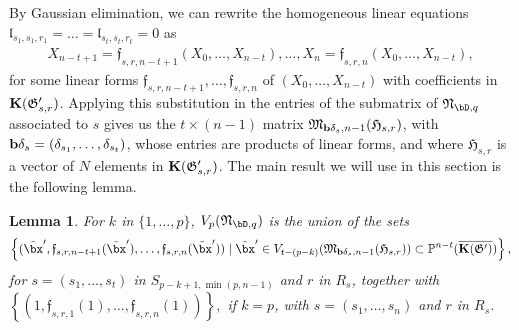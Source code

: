 \documentclass[12pt]{article}
\newtheorem{lemma}[definition]{Lemma}
\begin{document}
By Gaussian elimination, we can rewrite the homogeneous linear
equations
$\mathfrak{l}_{s_1,s_1,r_1}=\dots=\mathfrak{l}_{s_t,s_t,r_t}=0$ as
\begin{align}\label{eq:f_sr}
X_{n-t+1}=\mathfrak{f}_{s,r,n-t+1}(X_0,\dots,X_{n-t}),\dots,X_{n}=\mathfrak{f}_{s,r,n}(X_0,\dots,X_{n-t}),  
\end{align}
for some linear forms
$\mathfrak{f}_{s,r,n-t+1},\dots,\mathfrak{f}_{s,r,n}$ of
$(X_0,\dots,X_{n-t})$ with coefficients in
$\mathbf{K}(\mathfrak{G}'_{s,r})$. Applying this substitution in the entries
of the submatrix of ${\mathfrak{N}_{\bD,q}}$ associated to $s$ gives
us the $t \times (n-1)$ matrix
$\mathfrak{M}_{\mathbf{b}\delta_s,n-1}(\mathfrak{H}_{s,r})$, with
$\mathbf{b}\delta_s=(\delta_{s_1},\dots,\delta_{s_t})$, whose entries are products of linear
forms, and where $\mathfrak{H}_{s,r}$ is a vector of $N$ elements in
$\mathbf{K}(\mathfrak{G}'_{s,r})$.  The main result we will use in this
section is the following lemma.
\begin{lemma}\label{lemma:union}
  For $k$ in $\{1,\dots,p\}$, $V_p(\mathfrak{N}_{\bD,q})$ is the
  union of the sets
 \begin{align}\label{eq:union}
 \left \{(\tilde\bx',\mathfrak{f}_{s,r,n-t+1}(\tilde\bx'),\dots,\mathfrak{f}_{s,r,n}(\tilde\bx')) \mid \tilde\bx' \in
  V_{t-(p-k)}(\mathfrak{M}_{\b\delta_s,n-1}(\mathfrak{H}_{s,r})) \subset \P^{n-t}(\KKGpbar)\right \},   
 \end{align}
 for $s=(s_1,\dots,s_t)$ in $S_{p-k+1,\min(p,n-1)}$ and $r$ in $R_s$, together with
 $\left \{
 (1,\mathfrak{f}_{s,r,1}(1),\dots,\mathfrak{f}_{s,r,n}(1))\right
 \},$ if $k=p$, with $s=(s_1,\dots,s_n)$ and $r$ in $R_s$.
\end{lemma}
\end{document}
